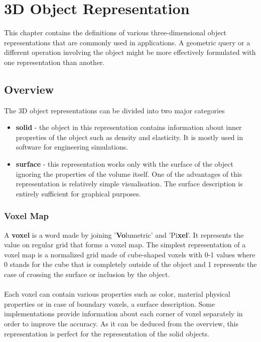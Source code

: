 \chapter{3D Object Representation}

This chapter contains the definitions of various three-dimensional object representations
that are commonly used in applications. A geometric query or a different operation involving the
object might be more effectively formulated with one representation than another.

\section{Overview}

The 3D object representations can be divided into two major categories

\begin{itemize}
\item \textbf{solid} - the object in this representation contains information about inner
propreties of the object such as density and elasticity. It is mostly used in software for
engineering simulations.

\item \textbf{surface} - this representation works only with the surface of the object
ignoring the properties of the volume itself. One of the advantages of this representation is
relatively simple visualisation. The surface description is entirely sufficient for graphical purposes.
\end{itemize}

\subsection{Voxel Map}

A \textbf{voxel} is a word made by joining '\textbf{Vo}lumetric' and 'Pi\textbf{xel}'. It represents
the value on regular grid that forms a voxel map. The simplest representation of a voxel map is
a normalized grid made of cube-shaped voxels with 0-1 values where 0 stands for the cube that is completely
outside of the object and 1 represents the case of crossing the surface or inclusion by the object.
\\
\\
Each voxel can contain various properties such as color, material physical properties or
in case of boundary voxels, a surface description. Some implementations provide information about
each corner of voxel separately in order to improve the accuracy.
As it can be deduced from the overview, this representation is perfect for the representation
of the solid objects.

